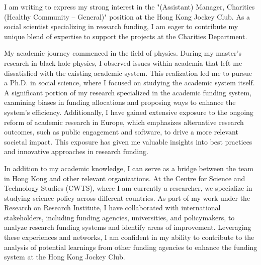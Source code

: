 \documentclass[11pt, a4paper]{awesome-cv}
\begin{document}
\makecvheader[R]

\makecvfooter
  {}%
  {}%
  {}

\makelettertitle

\begin{cvletter}


I am writing to express my strong interest in the "(Assistant) Manager, Charities (Healthy Community – General)" position at the Hong Kong Jockey Club. As a social scientist specializing in research funding, I am eager to contribute my unique blend of expertise to support the projects at the Charities Department.

My academic journey commenced in the field of physics. During my master's research in black hole physics, I observed issues within academia that left me dissatisfied with the existing academic system. This realization led me to pursue a Ph.D. in social science, where I focused on studying the academic system itself. A significant portion of my research specialized in the academic funding system, examining biases in funding allocations and proposing ways to enhance the system's efficiency. Additionally, I have gained extensive exposure to the ongoing reform of academic research in Europe, which emphasizes alternative research outcomes, such as public engagement and software, to drive a more relevant societal impact. This exposure has given me valuable insights into best practices and innovative approaches in research funding.

In addition to my academic knowledge, I can serve as a bridge between the team in Hong Kong and other relevant organizations. At the Centre for Science and Technology Studies (CWTS), where I am currently a researcher, we specialize in studying science policy across different countries. As part of my work under the Research on Research Institute, I have collaborated with international stakeholders, including funding agencies, universities, and policymakers, to analyze research funding systems and identify areas of improvement. Leveraging these experiences and networks, I am confident in my ability to contribute to the analysis of potential learnings from other funding agencies to enhance the funding system at the Hong Kong Jockey Club.



\end{cvletter}
\end{document}
